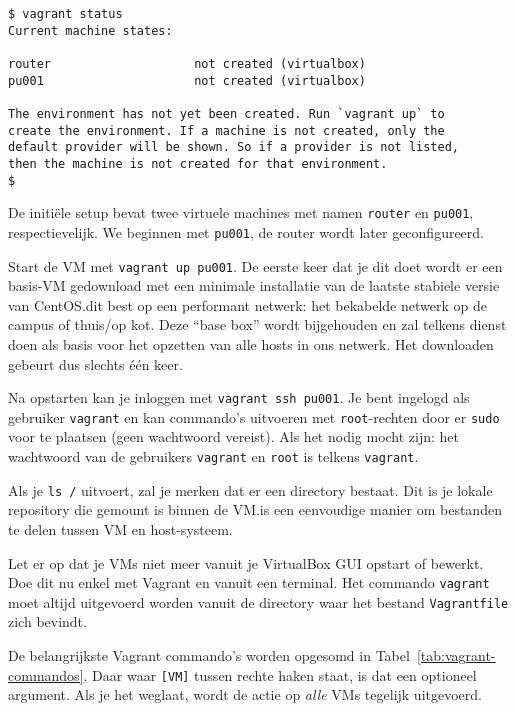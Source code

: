 \begin{verbatim}
$ vagrant status
Current machine states:

router                    not created (virtualbox)
pu001                     not created (virtualbox)

The environment has not yet been created. Run `vagrant up` to
create the environment. If a machine is not created, only the
default provider will be shown. So if a provider is not listed,
then the machine is not created for that environment.
$
\end{verbatim}

De initiële setup bevat twee virtuele machines met namen \texttt{router} en \texttt{pu001}, respectievelijk. We beginnen met \texttt{pu001}, de router wordt later geconfigureerd.

Start de VM met \texttt{vagrant up pu001}. De eerste keer dat je dit doet wordt er een basis-VM gedownload met een minimale installatie van de laatste stabiele versie van CentOS.\@Doe dit best op een performant netwerk: het bekabelde netwerk op de campus of thuis/op kot. Deze ``base box'' wordt bijgehouden en zal telkens dienst doen als basis voor het opzetten van alle hosts in ons netwerk. Het downloaden gebeurt dus slechts één keer.

Na opstarten kan je inloggen met \texttt{vagrant\ ssh\ pu001}. Je bent ingelogd als gebruiker \texttt{vagrant} en kan commando's uitvoeren met \texttt{root}-rechten door er \texttt{sudo} voor te plaatsen (geen wachtwoord vereist). Als het nodig mocht zijn: het wachtwoord van de gebruikers \texttt{vagrant} en \texttt{root} is telkens \texttt{vagrant}.

Als je \texttt{ls\ /} uitvoert, zal je merken dat er een directory  bestaat. Dit is je lokale repository die gemount is binnen de VM.\@Dit is een eenvoudige manier om bestanden te delen tussen VM en host-systeem.

Let er op dat je VMs niet meer vanuit je VirtualBox GUI opstart of bewerkt. Doe dit nu enkel met Vagrant en vanuit een terminal. Het commando \texttt{vagrant} moet altijd uitgevoerd worden vanuit de directory waar het bestand \texttt{Vagrantfile} zich bevindt.

De belangrijkste Vagrant commando's worden opgesomd in Tabel~\ref{tab:vagrant-commandos}. Daar waar \texttt{[VM]} tussen rechte haken staat, is dat een optioneel argument. Als je het weglaat, wordt de actie op \emph{alle} VMs tegelijk uitgevoerd.

